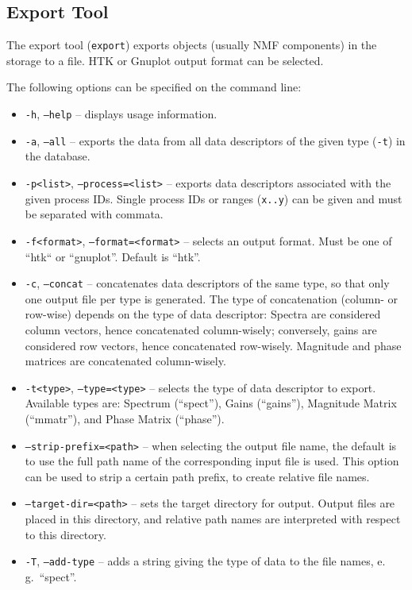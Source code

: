 \subsection{Export Tool}

The export tool ({\tt export}) exports objects (usually NMF components)
in the storage to a file.
HTK or Gnuplot output format can be selected.

\noindent The following options can be specified on the command line:
\begin{itemize}
  \item {\tt -h}, {\tt --help} -- displays usage information.
  \item {\tt -a}, {\tt --all} -- exports the data from all data descriptors of
    the given type ({\tt -t}) in the database.
  \item {\tt -p<list>}, {\tt --process=<list>} -- exports data descriptors 
    associated with the given process IDs. Single process IDs or ranges 
    ({\tt x..y}) can be given and must be separated with commata.
  \item {\tt -f<format>}, {\tt --format=<format>} -- selects an output format.
    Must be one of ``htk`` or ``gnuplot''. Default is ``htk''.
  \item {\tt -c}, {\tt --concat} -- concatenates data descriptors of the same
  type, so that only one output file per type is generated.
  The type of concatenation (column- or row-wise) depends on the type of
  data descriptor: Spectra are considered column vectors, hence concatenated
  column-wisely; conversely, gains are considered row vectors, hence
  concatenated row-wisely. Magnitude and phase matrices are concatenated
  column-wisely.
  \item {\tt -t<type>}, {\tt --type=<type>} -- selects the type of data
  descriptor to export. Available types are: Spectrum (``spect''), Gains
  (``gains''), Magnitude Matrix (``mmatr''), and Phase Matrix (``phase'').
  \item {\tt --strip-prefix=<path>} -- when selecting the output file name, the
  default is to use the full path name of the corresponding input file is used.
  This option can be used to strip a certain path prefix, to create relative
  file names.
  \item {\tt --target-dir=<path>} -- sets the target directory for output.
  Output files are placed in this directory, and relative path names are
  interpreted with respect to this directory.
  \item {\tt -T}, {\tt --add-type} -- adds a string giving the type of data to
  the file names, e.\,g.\ ``spect''.
\end{itemize}


